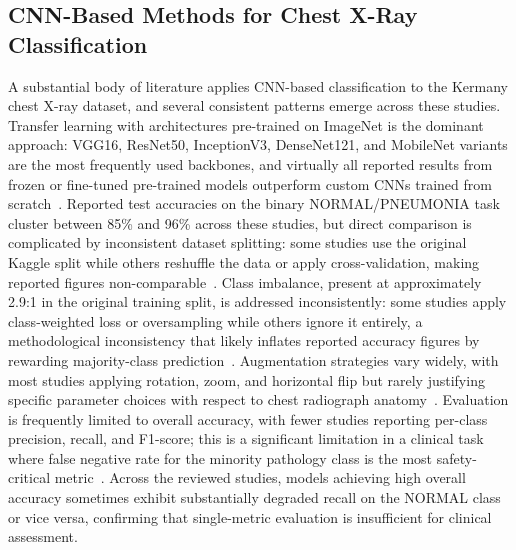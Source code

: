 \documentclass[preprint,12pt]{elsarticle}
\begin{document}
\subsection{CNN-Based Methods for Chest X-Ray Classification}
A substantial body of literature applies CNN-based classification to
the Kermany chest X-ray dataset, and several consistent patterns
emerge across these studies.
Transfer learning with architectures pre-trained on ImageNet is the
dominant approach: VGG16, ResNet50, InceptionV3, DenseNet121, and
MobileNet variants are the most frequently used backbones, and
virtually all reported results from frozen or fine-tuned pre-trained
models outperform custom CNNs trained from
scratch~\cite{chouhan2020,liang2020,reshan2023}.
Reported test accuracies on the binary NORMAL/PNEUMONIA task cluster
between 85\% and 96\% across these studies, but direct comparison is
complicated by inconsistent dataset splitting: some studies use the
original Kaggle split while others reshuffle the data or apply
cross-validation, making reported figures non-comparable~\cite{hashmi2020}.
Class imbalance, present at approximately 2.9:1 in the original
training split, is addressed inconsistently: some studies apply
class-weighted loss or oversampling while others ignore it entirely,
a methodological inconsistency that likely inflates reported accuracy
figures by rewarding majority-class prediction~\cite{reshan2023}.
Augmentation strategies vary widely, with most studies applying
rotation, zoom, and horizontal flip but rarely justifying specific
parameter choices with respect to chest radiograph
anatomy~\cite{chouhan2020}.
Evaluation is frequently limited to overall accuracy, with fewer
studies reporting per-class precision, recall, and F1-score; this
is a significant limitation in a clinical task where false negative
rate for the minority pathology class is the most safety-critical
metric~\cite{hashmi2020}.
Across the reviewed studies, models achieving high overall accuracy
sometimes exhibit substantially degraded recall on the NORMAL class
or vice versa, confirming that single-metric evaluation is
insufficient for clinical assessment.

\end{document}

